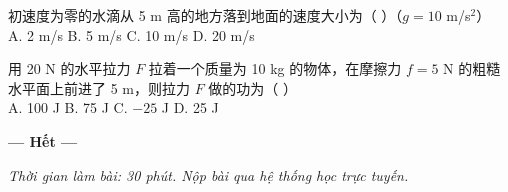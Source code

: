 \documentclass[11pt, a4paper]{article}
\begin{document}
\begin{baitap}[19]
初速度为零的水滴从 5 m 高的地方落到地面的速度大小为（ ）（$g=10$ m/s$^2$）\\[4pt]
A. 2 m/s \quad B. 5 m/s \quad C. 10 m/s \quad D. 20 m/s
\end{baitap}

\begin{baitap}[20]
用 20 N 的水平拉力 $F$ 拉着一个质量为 10 kg 的物体，在摩擦力 $f=5$ N 的粗糙水平面上前进了 5 m，则拉力 $F$ 做的功为（ ）\\[4pt]
A. 100 J \quad B. 75 J \quad C. $-25$ J \quad D. 25 J
\end{baitap}

\vspace{0.5cm}
\begin{center}
\textbf{--- Hết ---}
\end{center}

\vspace{0.3cm}
\noindent\emph{Thời gian làm bài: 30 phút. Nộp bài qua hệ thống học trực tuyến.}
\end{document}
